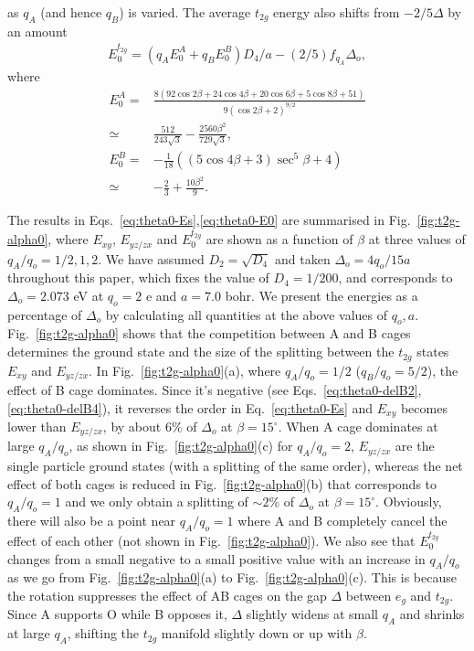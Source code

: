 \documentclass[a4paper,prb,twocolumn]{revtex4-1}  %
\newcommand{\rev}[1]{{\color{blue}{#1}}}
\begin{document}
  as $q_A$ (and hence $q_B$)
  is varied.
The average $t_{2g}$ energy
 also shifts from
$-2/5\Delta$ by an amount
\begin{align}
\label{eq:theta0-E0}
E_{0}^{t_{2g}} = \left(q_A E_{0}^A + q_BE_{0}^B\right)D_4/a
-(2/5)f_{q_A}\Delta_{o},
 \end{align}
 where
\begin{align}
\nonumber
E_{0}^A =&
 \frac{8 (92 \cos 2\beta+24 \cos 4\beta+20 \cos 6\beta+5 \cos 8\beta+51)}{9 (\cos 2\beta+2)^{9/2}}\\
 \simeq& \frac{512}{243 \sqrt{3}}-\frac{2560 \beta ^2}{729 \sqrt{3}},\\
 \nonumber
E_{0}^B=&
 -\frac{1}{18} \left((5 \cos 4\beta+3) \sec ^5\beta+4\right)\\
 \simeq& -\frac{2}{3}+\frac{10 \beta ^2}{9}.
 \end{align}
 
The results in Eqs.~\ref{eq:theta0-Es},\ref{eq:theta0-E0}
are summarised in Fig.~\ref{fig:t2g-alpha0},
where $E_{xy}$, $E_{yz/zx}$ and $E_0^{t_{2g}}$ are shown
as a function of $\beta$
at three values of $q_A/q_o=1/2,1,2$.
We have 
assumed $D_2=\sqrt{D_4}$ and
taken $\Delta_o=4q_o/15a$ throughout this paper,
which fixes the value of $D_4=1/200$, 
and corresponds to $\Delta_o= 2.073$ eV at 
$q_o=2$ e and $a=7.0$ bohr.
We present the energies as a percentage of $\Delta_o$
by calculating all quantities at the above values of $q_o,a$.
Fig.~\ref{fig:t2g-alpha0} shows that
the competition between A and B cages
determines the ground state and the size of the splitting between the 
$t_{2g}$ states
$E_{xy}$ and $E_{yz/zx}$.
In Fig.~\ref{fig:t2g-alpha0}(a),
where $q_A/q_o=1/2$ ($q_B/q_o=5/2$),
the effect of B cage dominates.
Since it's negative (see Eqs.~\ref{eq:theta0-delB2},\ref{eq:theta0-delB4}),
it reverses the order in Eq.~\ref{eq:theta0-Es}
and $E_{xy}$ becomes lower than $E_{yz/zx}$, by about $6\%$ of $\Delta_o$ at $\beta=15^\circ$.
When A cage dominates at large $q_A/q_o$,
as shown in Fig.~\ref{fig:t2g-alpha0}(c) for $q_A/q_o=2$,
$E_{yz/zx}$ are the single particle ground states
 (with a splitting of the same order), %
whereas the net effect of both cages
is reduced in Fig.~\ref{fig:t2g-alpha0}(b)
that corresponds to $q_A/q_o=1$
and we only obtain a splitting of $\sim2\%$ of $\Delta_o$ at $\beta=15^\circ$.
Obviously, there will also be a point near 
$q_A/q_o=1$ where A and B completely 
cancel the effect of each other (not shown in Fig.~\ref{fig:t2g-alpha0}).
We also see that $E_0^{t_{2g}}$ changes from a small negative to a small positive value
with an increase in $q_A/q_o$ as we
go from Fig.~\ref{fig:t2g-alpha0}(a)
to Fig.~\ref{fig:t2g-alpha0}(c).
This is because the rotation suppresses the
effect of AB cages on the
gap $\Delta$ between $e_{g}$ and $t_{2g}$.
Since A supports O while B opposes it,
$\Delta$ slightly widens at small $q_A$ and shrinks at large $q_A$,
shifting the $t_{2g}$ manifold slightly down or up with $\beta$.
\end{document}
